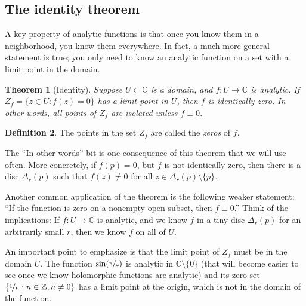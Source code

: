 \documentclass[12pt,openany]{book}
\newcommand{\C}{{\mathbb{C}}}
\newcommand{\Z}{{\mathbb{Z}}}
\newcommand{\myquote}[1]{``#1''}
\theoremstyle{plain}
\newtheorem{thm}{Theorem}[section]
\theoremstyle{remark}
\theoremstyle{definition}
\newtheorem{defn}[thm]{Definition}
\theoremstyle{exercise}
\theoremstyle{example}
\begin{document}
\subsection{The identity theorem}

A key property of analytic functions is that once you know them
in a neighborhood, you know them everywhere.  In fact, a much more general
statement is true; you only need to know an analytic function on a set with
a limit point in the domain.

\begin{thm}[Identity]%
\label{thm:identity}
Suppose $U \subset \C$ is a domain, 
and $f \colon U \to \C$ is analytic.
If $Z_f = \bigl\{ z \in U : f(z) = 0 \bigr\}$
has a limit point in $U$, then $f$ is identically zero.
In other words, all points of $Z_f$ are isolated unless $f \equiv 0$.
\end{thm}

\begin{defn}
The points in the set $Z_f$ are called the \emph{zeros} of $f$.
\end{defn}

The \myquote{In other words} bit is
one consequence of this theorem that we will use often.  More
concretely, if $f(p)=0$, but $f$ is not
identically zero, then there is a disc $\Delta_r(p)$ such that
$f(z) \neq 0$ for all $z \in \Delta_r(p) \setminus \{ p \}$.

Another common application of the theorem is the following weaker statement:
\myquote{If the function is zero on a nonempty open subset, then $f \equiv 0$.}
Think of the implications:  If $f \colon U \to \C$ is analytic, and we know
$f$ in a tiny disc $\Delta_r(p)$ for an arbitrarily small $r$, then
we know $f$ on all of $U$.

An important point to emphasize is that the limit point of $Z_f$
must be in the domain $U$.
The function $\sin(\nicefrac{\pi}{z})$ is analytic
in $\C \setminus \{ 0 \}$
(that will become easier to see once we know holomorphic functions 
are analytic)
and its zero set
$\{ \nicefrac{1}{n} : n \in \Z, n \neq 0 \}$
has a limit point at the origin,
which is not in the domain of the function.
\end{document}
